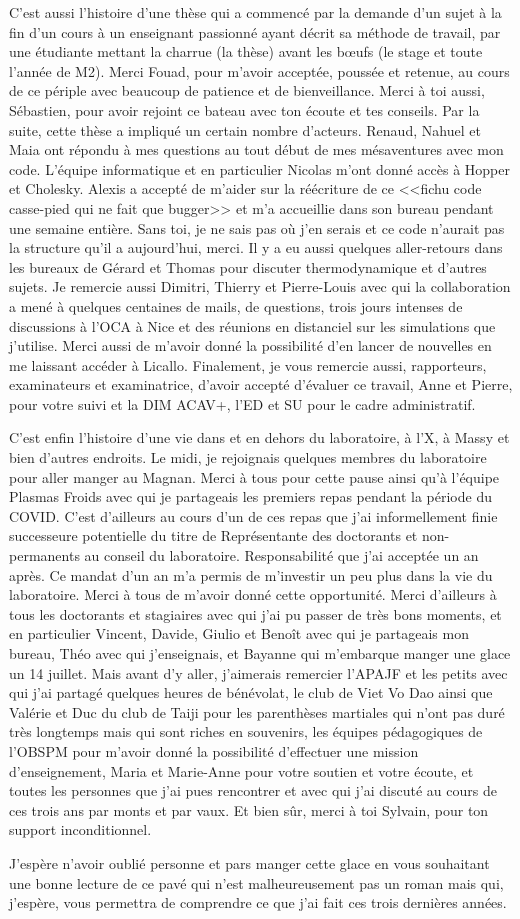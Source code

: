 C'est aussi l'histoire d'une thèse qui a commencé par la demande d'un sujet à la fin d'un cours à un enseignant passionné ayant décrit sa méthode de travail, par une étudiante mettant la charrue (la thèse) avant les bœufs (le stage et toute l'année de M2). Merci Fouad, pour m'avoir acceptée, poussée et retenue, au cours de ce périple avec beaucoup de patience et de bienveillance. Merci à toi aussi, Sébastien, pour avoir rejoint ce bateau avec ton écoute et tes conseils. Par la suite, cette thèse a impliqué un certain nombre d'acteurs. Renaud, Nahuel et Maia ont répondu à mes questions au tout début de mes mésaventures avec mon code. L'équipe informatique et en particulier Nicolas m'ont donné accès à Hopper et Cholesky. Alexis a accepté de m'aider sur la réécriture de ce <<fichu code casse-pied qui ne fait que bugger>> et m'a accueillie dans son bureau pendant une semaine entière. Sans toi, je ne sais pas où j'en serais et ce code n'aurait pas la structure qu'il a aujourd'hui, merci. Il y a eu aussi quelques aller-retours dans les bureaux de Gérard et Thomas pour discuter thermodynamique et d'autres sujets. Je remercie aussi Dimitri, Thierry et Pierre-Louis avec qui la collaboration a mené à quelques centaines de mails, de questions, trois jours intenses de discussions à l'\ac{OCA} à Nice et des réunions en distanciel sur les simulations que j'utilise. Merci aussi de m'avoir donné la possibilité d'en lancer de nouvelles en me laissant accéder à Licallo. Finalement, je vous remercie aussi, rapporteurs, examinateurs et examinatrice, d'avoir accepté d'évaluer ce travail, Anne et Pierre, pour votre suivi et la DIM ACAV+, l'ED et \ac{SU} pour le cadre administratif.  

C'est enfin l'histoire d'une vie dans et en dehors du laboratoire, à l'\ac{X}, à Massy et bien d'autres endroits. Le midi, je rejoignais quelques membres du laboratoire pour aller manger au Magnan. Merci à tous pour cette pause ainsi qu'à l'équipe Plasmas Froids avec qui je partageais les premiers repas pendant la période du COVID. C'est d'ailleurs au cours d'un de ces repas que j'ai informellement finie successeure potentielle du titre de Représentante des doctorants et non-permanents au conseil du laboratoire. Responsabilité que j'ai acceptée un an après. Ce mandat d'un an m'a permis de m'investir un peu plus dans la vie du laboratoire. Merci à tous de m'avoir donné cette opportunité. Merci d'ailleurs à tous les doctorants et stagiaires avec qui j'ai pu passer de très bons moments, et en particulier Vincent, Davide, Giulio et Benoît avec qui je partageais mon bureau, Théo avec qui j'enseignais, et Bayanne qui m'embarque manger une glace un 14 juillet. Mais avant d'y aller, j'aimerais remercier l'APAJF et les petits avec qui j'ai partagé quelques heures de bénévolat, le club de Viet Vo Dao ainsi que Valérie et Duc du club de Taiji pour les parenthèses martiales qui n'ont pas duré très longtemps mais qui sont riches en souvenirs, les équipes pédagogiques de l'\ac{OBSPM} pour m'avoir donné la possibilité d'effectuer une mission d'enseignement, Maria et Marie-Anne pour votre soutien et votre écoute, et toutes les personnes que j'ai pues rencontrer et avec qui j'ai discuté au cours de ces trois ans par monts et par vaux. Et bien sûr, merci à toi Sylvain, pour ton support inconditionnel. 

J'espère n'avoir oublié personne et pars manger cette glace en vous souhaitant une bonne lecture de ce pavé qui n'est malheureusement pas un roman mais qui, j'espère, vous permettra de comprendre ce que j'ai fait ces trois dernières années.
